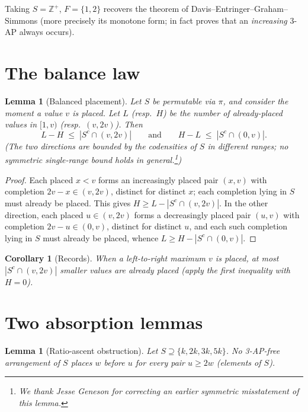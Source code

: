 \documentclass[11pt]{article}
\newtheorem{lemma}[theorem]{Lemma}
\newtheorem{corollary}[theorem]{Corollary}
\theoremstyle{definition}
\newcommand{\Z}{\mathbb{Z}}
\begin{document}
Taking $S = \Z^+$, $F = \{1,2\}$ recovers the theorem of Davis--Entringer--Graham--Simmons (more precisely its monotone form; \cite{DEGS77} in fact proves that an \emph{increasing} 3-AP always occurs).

\section{The balance law}

\begin{lemma}[Balanced placement]\label{lem:balance}
Let $S$ be permutable via $\pi$, and consider the moment a value $v$ is placed.
Let $L$ (resp.\ $H$) be the number of already-placed values in $[1,v)$ (resp.\
$(v,2v)$). Then
\[
L - H \;\le\; |S^c \cap (v, 2v)|
\qquad\text{and}\qquad
H - L \;\le\; |S^c \cap (0, v)|.
\]
(The two directions are bounded by the codensities of $S$ in \emph{different}
ranges; no symmetric single-range bound holds in general.\footnote{We thank
Jesse Geneson for correcting an earlier symmetric misstatement of this
lemma.})
\end{lemma}

\begin{proof}
Each placed $x < v$ forms an increasingly placed pair $(x,v)$ with completion
$2v - x \in (v, 2v)$, distinct for distinct $x$; each completion lying in $S$
must already be placed. This gives $H \ge L - |S^c \cap (v,2v)|$. In the other
direction, each placed $u \in (v, 2v)$ forms a decreasingly placed pair
$(u,v)$ with completion $2v - u \in (0, v)$, distinct for distinct $u$, and
each such completion lying in $S$ must already be placed, whence
$L \ge H - |S^c \cap (0,v)|$.
\end{proof}

\begin{corollary}[Records]\label{cor:records}
When a left-to-right maximum $v$ is placed, at most $|S^c \cap (v,2v)|$
smaller values are already placed (apply the first inequality with $H = 0$).
\end{corollary}

\section{Two absorption lemmas}

\begin{lemma}[Ratio-ascent obstruction]\label{lem:R}
Let $S \supseteq \{k, 2k, 3k, 5k\}$. No 3-AP-free arrangement of $S$ places $w$
before $u$ for every pair $u \ge 2w$ (elements of $S$).
\end{lemma}
\end{document}
